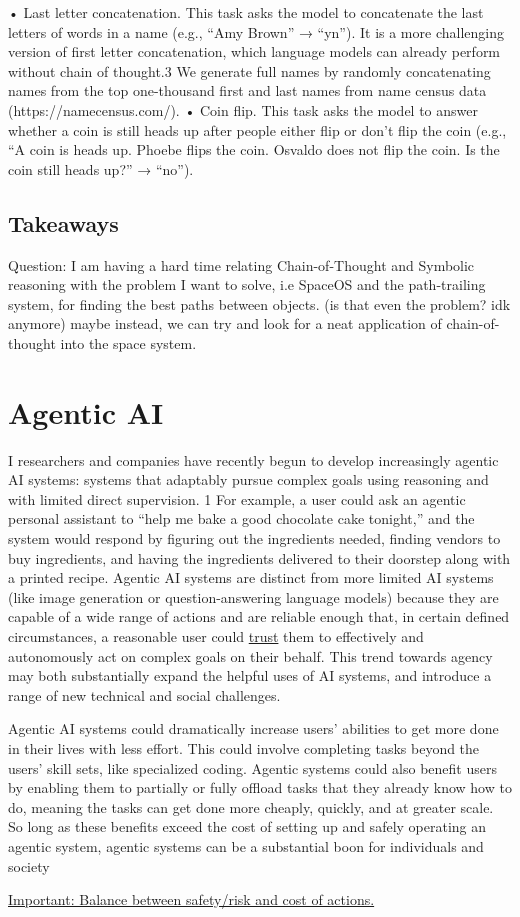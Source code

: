 \documentclass[10pt,a4paper]{article}
\begin{document}
\begin{multicols}{2}
• Last letter concatenation. This task asks the model
to concatenate the last letters of words in a name (e.g.,
“Amy Brown” → “yn”). It is a more challenging version
of first letter concatenation, which language models can
already perform without chain of thought.3 We generate
full names by randomly concatenating names from the
top one-thousand first and last names from name census
data (https://namecensus.com/).
• Coin flip. This task asks the model to answer whether a
coin is still heads up after people either flip or don’t flip
the coin (e.g., “A coin is heads up. Phoebe flips the coin.
Osvaldo does not flip the coin. Is the coin still heads up?”
→ “no”).

\subsection*{Takeaways}

Question: I am having a hard time relating Chain-of-Thought and Symbolic reasoning with the problem I want to solve, i.e SpaceOS and the path-trailing system, for finding the best paths between objects. (is that even the problem? idk anymore) maybe instead, we can try and look for a neat application of chain-of-thought into the space system. 


    \section*{Agentic AI}

    I researchers and companies have recently begun to develop increasingly agentic AI systems:
systems that adaptably pursue complex goals using reasoning and with limited direct supervision. 1
For example, a user could ask an agentic personal assistant to “help me bake a good chocolate cake
tonight,” and the system would respond by figuring out the ingredients needed, finding vendors
to buy ingredients, and having the ingredients delivered to their doorstep along with a printed
recipe. Agentic AI systems are distinct from more limited AI systems (like image generation or
question-answering language models) because they are capable of a wide range of actions and
are reliable enough that, in certain defined circumstances, a reasonable user could \underline{trust} them to
effectively and autonomously act on complex goals on their behalf. This trend towards agency may
both substantially expand the helpful uses of AI systems, and introduce a range of new technical
and social challenges.

Agentic AI systems could dramatically increase users’ abilities to get more done in their lives
with less effort. This could involve completing tasks beyond the users’ skill sets, like specialized
coding. Agentic systems could also benefit users by enabling them to partially or fully offload tasks
that they already know how to do, meaning the tasks can get done more cheaply, quickly, and at
greater scale. So long as these benefits exceed the cost of setting up and safely operating an agentic
system, agentic systems can be a substantial boon for individuals and society

\underline{Important: Balance between safety/risk and cost of actions.}



    
\end{multicols} %
\end{document}
